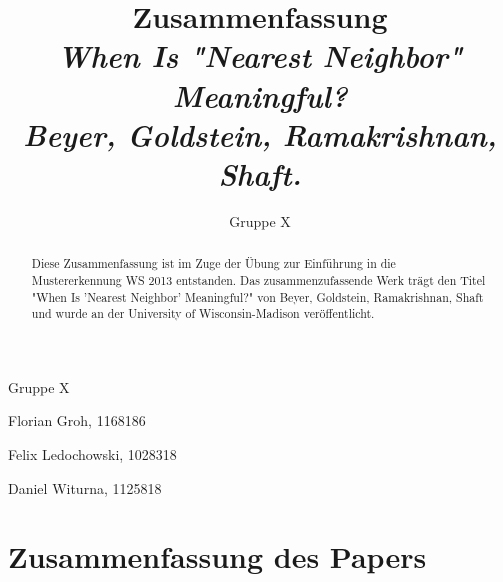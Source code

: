 \documentclass{article}
\begin{document}
\title{Zusammenfassung \\ \textit{When Is "Nearest Neighbor" Meaningful? \\ Beyer, Goldstein, Ramakrishnan, Shaft.}}
\author{Gruppe X}

\maketitle

\begin{abstract}
Diese Zusammenfassung ist im Zuge der Übung zur Einführung in die Mustererkennung WS 2013 entstanden. Das zusammenzufassende Werk trägt den Titel "When Is 'Nearest Neighbor' Meaningful?" von Beyer, Goldstein, Ramakrishnan, Shaft und wurde an der University of Wisconsin-Madison veröffentlicht.
\end{abstract}

\vfill

Gruppe X

Florian Groh, 1168186

Felix Ledochowski, 1028318

Daniel Witurna, 1125818

\pagebreak

\section{Zusammenfassung des Papers}
\end{document}
